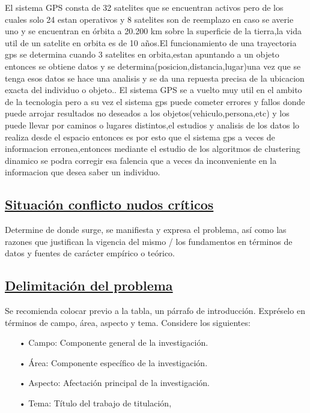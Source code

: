 \documentclass[12pt, a4paper, nofontenc, numbers=endperiod]{apa7}
\begin{document}
{{		\setlength{\parindent}{1.27cm}El sistema GPS consta de 32 satelites que se encuentran activos pero de los cuales solo 24 estan operativos y 8 satelites son de reemplazo en caso se averie uno y se encuentran en órbita a
		20.200 km sobre la superficie de la tierra,la vida util de un satelite en orbita es de 10 años.El funcionamiento de una trayectoria gps se determina cuando 3 satelites en orbita,estan apuntando a un objeto entonces se obtiene datos y se determina(posicion,distancia,lugar)una vez que se tenga esos datos se hace una analisis y se da una repuesta precisa de la ubicacion exacta del individuo o objeto.\setlength{\parindent}{1.27cm}.
		  \newpage
		  \restoregeometry
		\setlength{\parindent}{1.27cm}El sistema GPS se a vuelto muy util en el ambito de la tecnologia pero a su vez el sistema gps puede cometer errores y  fallos donde puede arrojar resultados no deseados a los objetos(vehiculo,persona,etc) y los puede llevar por caminos o lugares distintos,el estudios y analisis de los datos lo realiza desde el espacio entonces es por esto que el sistema gps a veces de informacion erronea,entonces mediante el estudio de los algoritmos de clustering dinamico se podra corregir esa falencia que a veces  da inconveniente en la informacion que desea saber un individuo.
		
		\subsection*{\normalsize  \underline{Situación conflicto nudos críticos}}
		Determine de donde surge, se manifiesta y expresa el problema, así como las razones que justifican la vigencia del mismo / los fundamentos en términos de datos y fuentes de carácter empírico o teórico.
		\subsection*{\normalsize  \underline{Delimitación del problema}} 
		\setlength{\parindent}{1.27cm}Se recomienda colocar previo a la tabla, un párrafo de introducción. Expréselo en términos de campo, área, aspecto y tema. Considere los siguientes:
	}
	\newpage
	\restoregeometry	
{\doublespacing
\begin{itemize}[leftmargin=1.70cm]
		\item[•] Campo: Componente general de la investigación. 
		\item[•] Área: Componente específico de la investigación. 
		\item[•] Aspecto: Afectación principal de la investigación. 
		\item[•] Tema: Título del trabajo de titulación,
\end{itemize}
}

}
\end{document}
